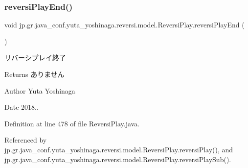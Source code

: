 \mbox{\label{classjp_1_1gr_1_1java__conf_1_1yuta__yoshinaga_1_1reversi_1_1model_1_1_reversi_play_abd208c350d3713ef6872faaa813ac8c3}} 
\subsubsection{\texorpdfstring{reversi\+Play\+End()}{reversiPlayEnd()}}
{\footnotesize\ttfamily void jp.\+gr.\+java\+\_\+conf.\+yuta\+\_\+yoshinaga.\+reversi.\+model.\+Reversi\+Play.\+reversi\+Play\+End (\begin{DoxyParamCaption}{ }\end{DoxyParamCaption})}



リバーシプレイ終了 

\begin{DoxyReturn}{Returns}
ありません 
\end{DoxyReturn}
\begin{DoxyAuthor}{Author}
Yuta Yoshinaga 
\end{DoxyAuthor}
\begin{DoxyDate}{Date}
2018.. 
\end{DoxyDate}


Definition at line 478 of file Reversi\+Play.\+java.



Referenced by jp.\+gr.\+java\+\_\+conf.\+yuta\+\_\+yoshinaga.\+reversi.\+model.\+Reversi\+Play.\+reversi\+Play(), and jp.\+gr.\+java\+\_\+conf.\+yuta\+\_\+yoshinaga.\+reversi.\+model.\+Reversi\+Play.\+reversi\+Play\+Sub().

